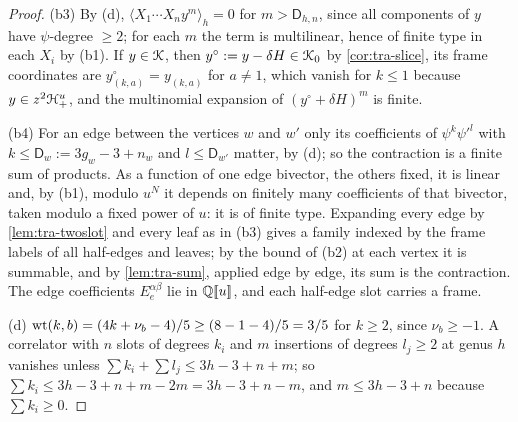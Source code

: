 \begin{proof}
(b3) By (d), $\langle X_1\cdots X_ny^m\rangle_h = 0$ for $m>\mathsf D_{h,n}$, since all components of $y$ have $\psi$-degree $\geq 2$; for each $m$ the term is multilinear, hence of finite type in each $X_i$ by (b1). If $y\in\mathcal{K}$, then $y^\circ := y-\delta H\in\mathcal{K}_{0}$ by \cref{cor:tra-slice}, its frame coordinates are $y^\circ_{(k,a)} = y_{(k,a)}$ for $a\neq 1$, which vanish for $k\leq 1$ because $y\in z^2\mathcal{H}^u_+$, and the multinomial expansion of $(y^\circ+\delta H)^m$ is finite.

(b4) For an edge between the vertices $w$ and $w'$ only its coefficients of $\psi^k\psi'^l$ with $k\leq\mathsf D_w := 3g_w-3+n_w$ and $l\leq\mathsf D_{w'}$ matter, by (d); so the contraction is a finite sum of products. As a function of one edge bivector, the others fixed, it is linear and, by (b1), modulo $u^N$ it depends on finitely many coefficients of that bivector, taken modulo a fixed power of $u$: it is of finite type. Expanding every edge by \cref{lem:tra-twoslot} and every leaf as in (b3) gives a family indexed by the frame labels of all half-edges and leaves; by the bound of (b2) at each vertex it is summable, and by \cref{lem:tra-sum}, applied edge by edge, its sum is the contraction. The edge coefficients $E^{\alpha\beta}_e$ lie in $\mathbb{Q}[\![ u ]\!]$, and each half-edge slot carries a frame.

(d) $\operatorname{wt}(k,b) = (4k+\nu_b-4)/5\geq(8-1-4)/5 = 3/5$ for $k\geq 2$, since $\nu_b\geq -1$. A correlator with $n$ slots of degrees $k_i$ and $m$ insertions of degrees $l_j\geq 2$ at genus $h$ vanishes unless $\sum k_i+\sum l_j\leq 3h-3+n+m$; so $\sum k_i\leq 3h-3+n+m-2m = 3h-3+n-m$, and $m\leq 3h-3+n$ because $\sum k_i\geq 0$.


\end{proof}
